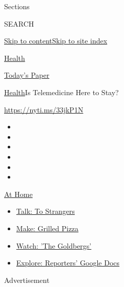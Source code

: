 Sections

SEARCH

\protect\hyperlink{site-content}{Skip to
content}\protect\hyperlink{site-index}{Skip to site index}

\href{https://www.nytimes.com/section/health}{Health}

\href{https://myaccount.nytimes.com/auth/login?response_type=cookie\&client_id=vi}{}

\href{https://www.nytimes.com/section/todayspaper}{Today's Paper}

\href{/section/health}{Health}\textbar{}Is Telemedicine Here to Stay?

\url{https://nyti.ms/33jkP1N}

\begin{itemize}
\item
\item
\item
\item
\item
\item
\end{itemize}

\href{https://www.nytimes.com/spotlight/at-home?action=click\&pgtype=Article\&state=default\&region=TOP_BANNER\&context=at_home_menu}{At
Home}

\begin{itemize}
\tightlist
\item
  \href{https://www.nytimes.com/2020/08/03/well/family/the-benefits-of-talking-to-strangers.html?action=click\&pgtype=Article\&state=default\&region=TOP_BANNER\&context=at_home_menu}{Talk:
  To Strangers}
\item
  \href{https://www.nytimes.com/2020/08/01/at-home/coronavirus-make-pizza-on-a-grill.html?action=click\&pgtype=Article\&state=default\&region=TOP_BANNER\&context=at_home_menu}{Make:
  Grilled Pizza}
\item
  \href{https://www.nytimes.com/2020/07/31/arts/television/goldbergs-abc-stream.html?action=click\&pgtype=Article\&state=default\&region=TOP_BANNER\&context=at_home_menu}{Watch:
  'The Goldbergs'}
\item
  \href{https://www.nytimes.com/interactive/2020/at-home/even-more-reporters-editors-diaries-lists-recommendations.html?action=click\&pgtype=Article\&state=default\&region=TOP_BANNER\&context=at_home_menu}{Explore:
  Reporters' Google Docs}
\end{itemize}

Advertisement

